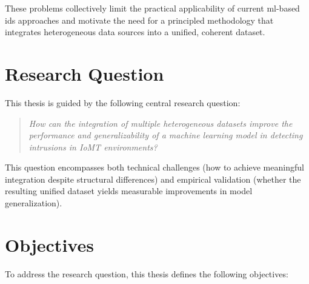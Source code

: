 These problems collectively limit the practical applicability of current \gls{ml}-based \gls{ids} approaches and motivate the need for a principled methodology that integrates heterogeneous data sources into a unified, coherent dataset.

\section{Research Question}
\label{sec:rq}

This thesis is guided by the following central research question:

\begin{quote}
\textit{How can the integration of multiple heterogeneous datasets improve the performance and generalizability of a machine learning model in detecting intrusions in IoMT environments?}
\end{quote}

This question encompasses both technical challenges (how to achieve meaningful integration despite structural differences) and empirical validation (whether the resulting unified dataset yields measurable improvements in model generalization).

\section{Objectives}
\label{sec:objectives}

To address the research question, this thesis defines the following objectives:

